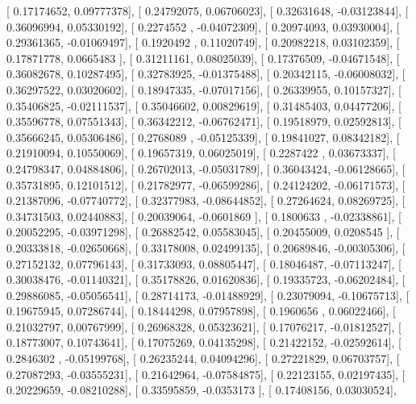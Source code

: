 \documentclass{article}
\begin{document}
       [ 0.17174652,  0.09777378],
       [ 0.24792075,  0.06706023],
       [ 0.32631648, -0.03123844],
       [ 0.36096994,  0.05330192],
       [ 0.2274552 , -0.04072309],
       [ 0.20974093,  0.03930004],
       [ 0.29361365, -0.01069497],
       [ 0.1920492 ,  0.11020749],
       [ 0.20982218,  0.03102359],
       [ 0.17871778,  0.0665483 ],
       [ 0.31211161,  0.08025039],
       [ 0.17376509, -0.04671548],
       [ 0.36082678,  0.10287495],
       [ 0.32783925, -0.01375488],
       [ 0.20342115, -0.06008032],
       [ 0.36297522,  0.03020602],
       [ 0.18947335, -0.07017156],
       [ 0.26339955,  0.10157327],
       [ 0.35406825, -0.02111537],
       [ 0.35046602,  0.00829619],
       [ 0.31485403,  0.04477206],
       [ 0.35596778,  0.07551343],
       [ 0.36342212, -0.06762471],
       [ 0.19518979,  0.02592813],
       [ 0.35666245,  0.05306486],
       [ 0.2768089 , -0.05125339],
       [ 0.19841027,  0.08342182],
       [ 0.21910094,  0.10550069],
       [ 0.19657319,  0.06025019],
       [ 0.2287422 ,  0.03673337],
       [ 0.24798347,  0.04884806],
       [ 0.26702013, -0.05031789],
       [ 0.36043424, -0.06128665],
       [ 0.35731895,  0.12101512],
       [ 0.21782977, -0.06599286],
       [ 0.24124202, -0.06171573],
       [ 0.21387096, -0.07740772],
       [ 0.32377983, -0.08644852],
       [ 0.27264624,  0.08269725],
       [ 0.34731503,  0.02440883],
       [ 0.20039064, -0.0601869 ],
       [ 0.1800633 , -0.02338861],
       [ 0.20052295, -0.03971298],
       [ 0.26882542,  0.05583045],
       [ 0.20455009,  0.0208545 ],
       [ 0.20333818, -0.02650668],
       [ 0.33178008,  0.02499135],
       [ 0.20689846, -0.00305306],
       [ 0.27152132,  0.07796143],
       [ 0.31733093,  0.08805447],
       [ 0.18046487, -0.07113247],
       [ 0.30038476, -0.01140321],
       [ 0.35178826,  0.01620836],
       [ 0.19335723, -0.06202484],
       [ 0.29886085, -0.05056541],
       [ 0.28714173, -0.01488929],
       [ 0.23079094, -0.10675713],
       [ 0.19675945,  0.07286744],
       [ 0.18444298,  0.07957898],
       [ 0.1960656 ,  0.06022466],
       [ 0.21032797,  0.00767999],
       [ 0.26968328,  0.05323621],
       [ 0.17076217, -0.01812527],
       [ 0.18773007,  0.10743641],
       [ 0.17075269,  0.04135298],
       [ 0.21422152, -0.02592614],
       [ 0.2846302 , -0.05199768],
       [ 0.26235244,  0.04094296],
       [ 0.27221829,  0.06703757],
       [ 0.27087293, -0.03555231],
       [ 0.21642964, -0.07584875],
       [ 0.22123155,  0.02197435],
       [ 0.20229659, -0.08210288],
       [ 0.33595859, -0.0353173 ],
       [ 0.17408156,  0.03030524],
\end{document}
